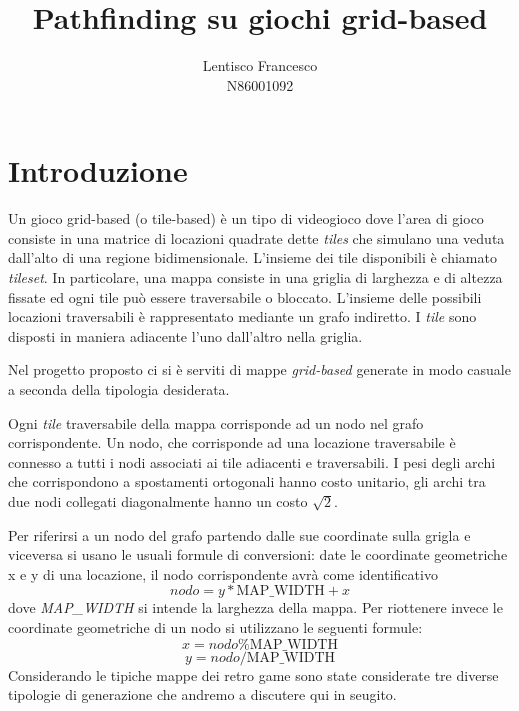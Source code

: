 \documentclass[11pt]{book}
\title{\textbf{Pathfinding su giochi grid-based}}
\author{Lentisco Francesco\\
N86001092}
\date{}
\begin{document}
\maketitle


\chapter{Introduzione}

Un gioco grid-based (o tile-based) \`e un tipo di videogioco dove l'area di gioco consiste in una matrice di locazioni quadrate dette \emph{tiles} che simulano una veduta dall'alto di una regione bidimensionale. L'insieme dei tile disponibili \`e chiamato \emph{tileset}. In particolare, una mappa consiste in una griglia di larghezza e di altezza fissate ed ogni tile pu\`o essere traversabile o bloccato. L'insieme delle possibili locazioni traversabili \`e rappresentato mediante un grafo indiretto.  I \emph{tile} sono disposti in maniera adiacente l'uno dall'altro nella griglia. \par Nel progetto proposto ci si \`e serviti di mappe \emph{grid-based} generate in modo casuale a seconda della tipologia desiderata.\par Ogni \emph{tile} traversabile della mappa corrisponde ad un nodo nel grafo corrispondente. Un nodo, che corrisponde ad una locazione traversabile \`e connesso a tutti i nodi associati ai tile adiacenti e traversabili. I pesi degli archi che corrispondono a spostamenti ortogonali hanno costo unitario, gli archi tra due nodi collegati diagonalmente hanno un costo $\sqrt{2}$. \par Per riferirsi a un nodo del grafo partendo dalle sue coordinate sulla grigla e viceversa si usano le usuali formule di conversioni:
date le coordinate geometriche x e y di una locazione, il nodo corrispondente avr\`a come identificativo \begin{equation} nodo = y*\mbox{MAP\_WIDTH} + x \end{equation} dove \emph{MAP\_WIDTH} si intende la larghezza della mappa. Per riottenere invece le coordinate geometriche di un nodo si utilizzano le seguenti formule: \begin{equation} x = nodo \% \mbox{MAP\_WIDTH} \end{equation} \begin{equation} y = nodo / \mbox{MAP\_WIDTH} \end{equation} 
Considerando le tipiche mappe dei retro game sono state considerate tre diverse tipologie di generazione che andremo a discutere qui in seugito.
\end{document}
